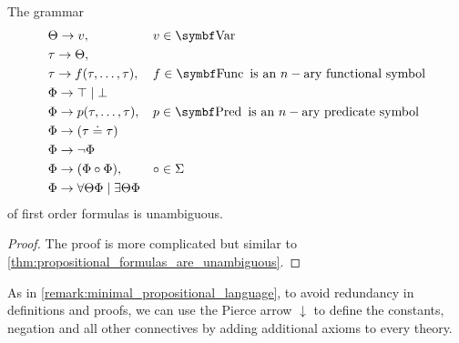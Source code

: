 \begin{proposition}\label{thm:first_order_formulas_are_unambiguous}
  The grammar
  \begin{displaymath}
    \begin{aligned}
      &\Theta \to v,                                          && v \in \Bold{Var} \\
      &\tau \to \Theta,                                       && \\
      &\tau \to f(\tau, \ldots, \tau),                        && f \in \Bold{Func} \text{ is an } n-\text{ary functional symbol} \\
      &\Phi \to \top \;|\; \bot                               && \\
      &\Phi \to p(\tau, \ldots, \tau),                        && p \in \Bold{Pred} \text{ is an } n-\text{ary predicate symbol} \\
      &\Phi \to (\tau \doteq \tau)                            && \\
      &\Phi \to \neg \Phi                                     && \\
      &\Phi \to (\Phi \circ \Phi),                            && \circ \in \Sigma \\
      &\Phi \to \forall \Theta \Phi \;|\; \exists \Theta \Phi && \\
    \end{aligned}
  \end{displaymath}
  of first order formulas is unambiguous.
\end{proposition}
\begin{proof}
  The proof is more complicated but similar to \cref{thm:propositional_formulas_are_unambiguous}.
\end{proof}

\begin{remark}\label{remark:minimal_first_order_language}
  As in \cref{remark:minimal_propositional_language}, to avoid redundancy in definitions and proofs, we can use the Pierce arrow \( \downarrow \) to define the constants, negation and all other connectives by adding additional axioms to every theory.
\end{remark}

